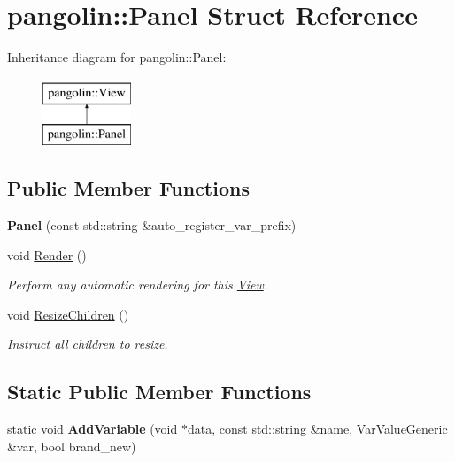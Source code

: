 \hypertarget{structpangolin_1_1_panel}{}\section{pangolin\+:\+:Panel Struct Reference}
\label{structpangolin_1_1_panel}
Inheritance diagram for pangolin\+:\+:Panel\+:\begin{figure}[H]
\begin{center}
\leavevmode
\includegraphics[height=2.000000cm]{structpangolin_1_1_panel}
\end{center}
\end{figure}
\subsection*{Public Member Functions}
\begin{DoxyCompactItemize}
\item 
{\bfseries Panel} (const std\+::string \&auto\+\_\+register\+\_\+var\+\_\+prefix)\hypertarget{structpangolin_1_1_panel_aa4def26e804158db784ce9720a2d7130}{}\label{structpangolin_1_1_panel_aa4def26e804158db784ce9720a2d7130}

\item 
void \hyperlink{structpangolin_1_1_panel_a4b9fa5d477bb518ad6917086d1faf2ca}{Render} ()
\begin{DoxyCompactList}\small\item\em Perform any automatic rendering for this \hyperlink{structpangolin_1_1_view}{View}. \end{DoxyCompactList}\item 
void \hyperlink{structpangolin_1_1_panel_aa7e3e26f6f45b2691755e055daf0317c}{Resize\+Children} ()\hypertarget{structpangolin_1_1_panel_aa7e3e26f6f45b2691755e055daf0317c}{}\label{structpangolin_1_1_panel_aa7e3e26f6f45b2691755e055daf0317c}

\begin{DoxyCompactList}\small\item\em Instruct all children to resize. \end{DoxyCompactList}\end{DoxyCompactItemize}
\subsection*{Static Public Member Functions}
\begin{DoxyCompactItemize}
\item 
static void {\bfseries Add\+Variable} (void $\ast$data, const std\+::string \&name, \hyperlink{classpangolin_1_1_var_value_generic}{Var\+Value\+Generic} \&var, bool brand\+\_\+new)\hypertarget{structpangolin_1_1_panel_a9b2b80fc8c13b4277d2d49d273251af3}{}\label{structpangolin_1_1_panel_a9b2b80fc8c13b4277d2d49d273251af3}

\end{DoxyCompactItemize}
